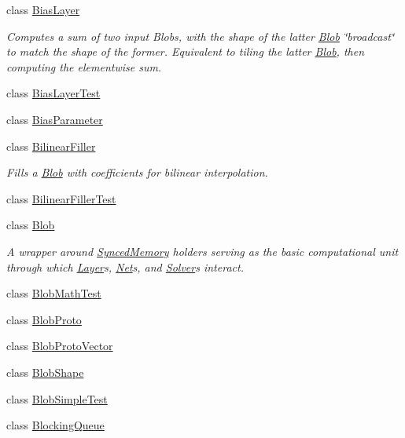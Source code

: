 \begin{DoxyCompactItemize}
\item 
class \mbox{\hyperlink{classcaffe_1_1_bias_layer}{Bias\+Layer}}
\begin{DoxyCompactList}\small\item\em Computes a sum of two input Blobs, with the shape of the latter \mbox{\hyperlink{classcaffe_1_1_blob}{Blob}} \char`\"{}broadcast\char`\"{} to match the shape of the former. Equivalent to tiling the latter \mbox{\hyperlink{classcaffe_1_1_blob}{Blob}}, then computing the elementwise sum. \end{DoxyCompactList}\item 
class \mbox{\hyperlink{classcaffe_1_1_bias_layer_test}{Bias\+Layer\+Test}}
\item 
class \mbox{\hyperlink{classcaffe_1_1_bias_parameter}{Bias\+Parameter}}
\item 
class \mbox{\hyperlink{classcaffe_1_1_bilinear_filler}{Bilinear\+Filler}}
\begin{DoxyCompactList}\small\item\em Fills a \mbox{\hyperlink{classcaffe_1_1_blob}{Blob}} with coefficients for bilinear interpolation. \end{DoxyCompactList}\item 
class \mbox{\hyperlink{classcaffe_1_1_bilinear_filler_test}{Bilinear\+Filler\+Test}}
\item 
class \mbox{\hyperlink{classcaffe_1_1_blob}{Blob}}
\begin{DoxyCompactList}\small\item\em A wrapper around \mbox{\hyperlink{classcaffe_1_1_synced_memory}{Synced\+Memory}} holders serving as the basic computational unit through which \mbox{\hyperlink{classcaffe_1_1_layer}{Layer}}s, \mbox{\hyperlink{classcaffe_1_1_net}{Net}}s, and \mbox{\hyperlink{classcaffe_1_1_solver}{Solver}}s interact. \end{DoxyCompactList}\item 
class \mbox{\hyperlink{classcaffe_1_1_blob_math_test}{Blob\+Math\+Test}}
\item 
class \mbox{\hyperlink{classcaffe_1_1_blob_proto}{Blob\+Proto}}
\item 
class \mbox{\hyperlink{classcaffe_1_1_blob_proto_vector}{Blob\+Proto\+Vector}}
\item 
class \mbox{\hyperlink{classcaffe_1_1_blob_shape}{Blob\+Shape}}
\item 
class \mbox{\hyperlink{classcaffe_1_1_blob_simple_test}{Blob\+Simple\+Test}}
\item 
class \mbox{\hyperlink{classcaffe_1_1_blocking_queue}{Blocking\+Queue}}

\end{DoxyCompactItemize}
